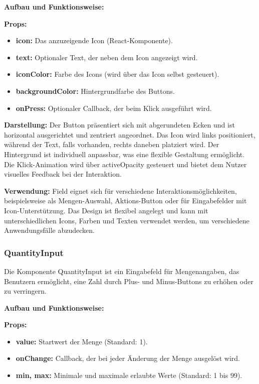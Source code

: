 \noindent\textbf{Aufbau und Funktionsweise:}

\textbf{Props:}
\begin{itemize}
    \item \textbf{icon:} Das anzuzeigende Icon (React-Komponente).
    \item \textbf{text:} Optionaler Text, der neben dem Icon angezeigt wird.
    \item \textbf{iconColor:} Farbe des Icons (wird über das Icon selbst gesteuert).
    \item \textbf{backgroundColor:} Hintergrundfarbe des Buttons.
    \item \textbf{onPress:} Optionaler Callback, der beim Klick ausgeführt wird.
\end{itemize}

\textbf{Darstellung:}
Der Button präsentiert sich mit abgerundeten Ecken und ist horizontal ausgerichtet und zentriert angeordnet. Das Icon wird links positioniert, während der Text, falls vorhanden, rechts daneben platziert wird. Der Hintergrund ist individuell anpassbar, was eine flexible Gestaltung ermöglicht. Die Klick-Animation wird über activeOpacity gesteuert und bietet dem Nutzer visuelles Feedback bei der Interaktion.

\noindent\textbf{Verwendung:} Field eignet sich für verschiedene Interaktionsmöglichkeiten, beispielsweise als Mengen-Auswahl, Aktions-Button oder für Eingabefelder mit Icon-Unterstützung. Das Design ist flexibel angelegt und kann mit unterschiedlichen Icons, Farben und Texten verwendet werden, um verschiedene Anwendungsfälle abzudecken.

\subsubsection{QuantityInput}
Die Komponente QuantityInput ist ein Eingabefeld für Mengenangaben, das Benutzern ermöglicht, eine Zahl durch Plus- und Minus-Buttons zu erhöhen oder zu verringern.

\noindent\textbf{Aufbau und Funktionsweise:}

\textbf{Props:}
\begin{itemize}
    \item \textbf{value:} Startwert der Menge (Standard: 1).
    \item \textbf{onChange:} Callback, der bei jeder Änderung der Menge ausgelöst wird.
    \item \textbf{min, max:} Minimale und maximale erlaubte Werte (Standard: 1 bis 99).
\end{itemize}

